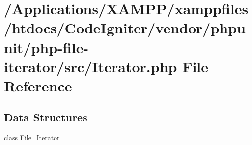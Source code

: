 \hypertarget{php-file-iterator_2src_2_iterator_8php}{}\section{/\+Applications/\+X\+A\+M\+P\+P/xamppfiles/htdocs/\+Code\+Igniter/vendor/phpunit/php-\/file-\/iterator/src/\+Iterator.php File Reference}
\label{php-file-iterator_2src_2_iterator_8php}
\subsection*{Data Structures}
\begin{DoxyCompactItemize}
\item 
class \mbox{\hyperlink{class_file___iterator}{File\+\_\+\+Iterator}}
\end{DoxyCompactItemize}
